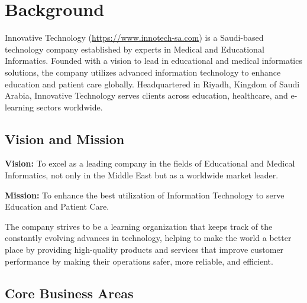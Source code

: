 
\section{Background}

Innovative Technology (\url{https://www.innotech-sa.com}) is a Saudi-based technology company established by experts in Medical and Educational Informatics. Founded with a vision to lead in educational and medical informatics solutions, the company utilizes advanced information technology to enhance education and patient care globally. Headquartered in Riyadh, Kingdom of Saudi Arabia, Innovative Technology serves clients across education, healthcare, and e-learning sectors worldwide.

\subsection{Vision and Mission}

\textbf{Vision:} To excel as a leading company in the fields of Educational and Medical Informatics, not only in the Middle East but as a worldwide market leader.\vspace{0.2cm}

\textbf{Mission:} To enhance the best utilization of Information Technology to serve Education and Patient Care.\vspace{0.2cm}

The company strives to be a learning organization that keeps track of the constantly evolving advances in technology, helping to make the world a better place by providing high-quality products and services that improve customer performance by making their operations safer, more reliable, and efficient.

\subsection{Core Business Areas}


